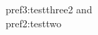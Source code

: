 \documentclass[11pt]{report} %
\begin{document}
\gls{pref3:testthree2} and \hfill\\
\gls{pref2:testtwo}

\printglossary[type=type3]
\printglossary[type=type1]
\printglossary[type=type2]


\end{document}
